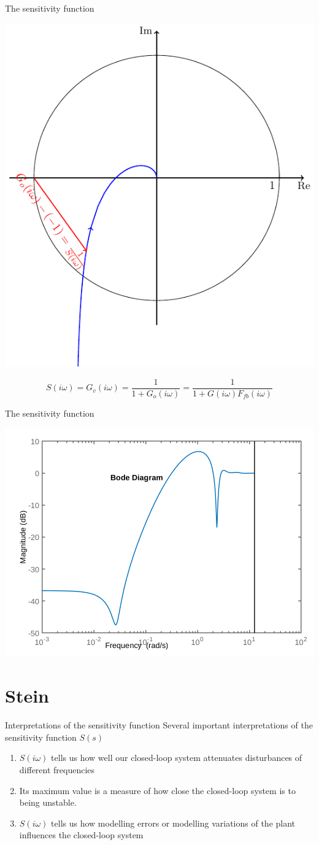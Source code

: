 \documentclass[presentation,aspectratio=169]{beamer}
\begin{document}
\begin{frame}[label={sec:org7251ce2}]{The sensitivity function}
\begin{center}
\includegraphics[width=0.4\linewidth]{../../figures/implane-sensitivity}
\end{center}

\[ S(i\omega) = G_v(i\omega) = \frac{1}{ 1 + G_o(i\omega)} = \frac{1}{1 + G(i\omega)F_{fb}(i\omega)} \]
\end{frame}




\begin{frame}[label={sec:orgeec76bd}]{The sensitivity function}
\begin{center}
\includegraphics[width=0.7\linewidth]{../../figures/sensitivity-example}
\end{center}
\end{frame}


\section{Stein}
\label{sec:orgace975b}

\begin{frame}[label={sec:orgb1d669d}]{Interpretations of the sensitivity function}
Several important interpretations of the sensitivity function \(S(s)\)
\begin{enumerate}
\item \(S(i\omega)\) tells us how well our closed-loop system attenuates disturbances of different frequencies
\item Its maximum value is a measure of how close the closed-loop system is to being unstable.
\item \(S(i\omega)\) tells us how modelling errors or modelling variations of the plant influences the closed-loop system
\end{enumerate}
\end{frame}
\end{document}
